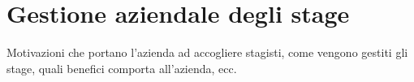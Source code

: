 \section{Gestione aziendale degli stage}
\label{sez:gestione-aziendale-stage}

Motivazioni che portano l'azienda ad accogliere stagisti, come vengono gestiti gli stage, quali benefici comporta all'azienda, ecc.\\